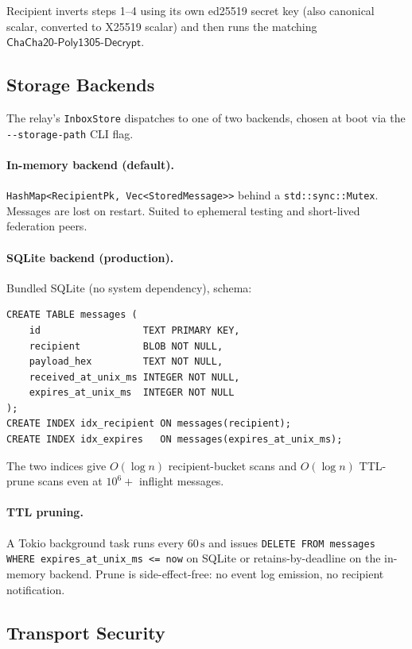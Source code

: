 Recipient inverts steps 1–4 using its own ed25519 secret key (also
canonical scalar, converted to X25519 scalar) and then runs the
matching $\mathsf{ChaCha20\text{-}Poly1305\text{-}Decrypt}$.

\subsection{Storage Backends}
\label{sec:relay-storage}

The relay's \verb|InboxStore| dispatches to one of two backends, chosen
at boot via the \verb|--storage-path| CLI flag.

\paragraph{In-memory backend (default).} \verb|HashMap<RecipientPk, Vec<StoredMessage>>|
behind a \verb|std::sync::Mutex|. Messages are lost on restart. Suited
to ephemeral testing and short-lived federation peers.

\paragraph{SQLite backend (production).} Bundled SQLite (no system
dependency), schema:

\begin{verbatim}
CREATE TABLE messages (
    id                  TEXT PRIMARY KEY,
    recipient           BLOB NOT NULL,
    payload_hex         TEXT NOT NULL,
    received_at_unix_ms INTEGER NOT NULL,
    expires_at_unix_ms  INTEGER NOT NULL
);
CREATE INDEX idx_recipient ON messages(recipient);
CREATE INDEX idx_expires   ON messages(expires_at_unix_ms);
\end{verbatim}

The two indices give $O(\log n)$ recipient-bucket scans and $O(\log n)$
TTL-prune scans even at $10^6+$ inflight messages.

\paragraph{TTL pruning.} A Tokio background task runs every $60\,\text{s}$
and issues
\verb|DELETE FROM messages WHERE expires_at_unix_ms <= now|
on SQLite or retains-by-deadline on the in-memory backend. Prune is
side-effect-free: no event log emission, no recipient notification.

\subsection{Transport Security}
\label{sec:relay-tls}

